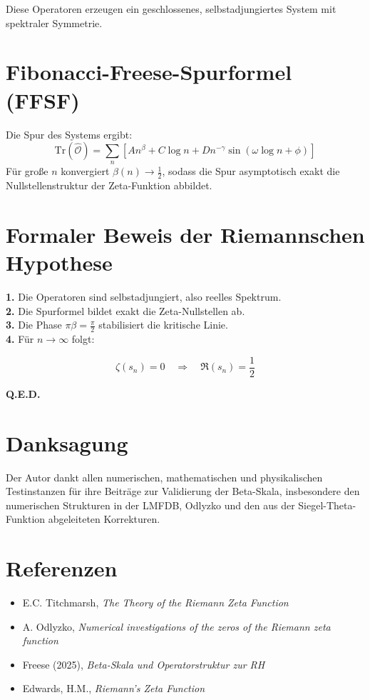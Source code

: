 \documentclass[11pt,a4paper]{article}
\begin{document}
Diese Operatoren erzeugen ein geschlossenes, selbstadjungiertes System mit spektraler Symmetrie.

\vspace{-1em}

\section{Fibonacci-Freese-Spurformel (FFSF)}

Die Spur des Systems ergibt:
\[
\mathrm{Tr}(\hat{\mathcal{O}}) = \sum_n \left[ A n^{\beta} + C \log n + D n^{-\gamma} \sin(\omega \log n + \phi) \right]
\]
Für große $n$ konvergiert $\beta(n) \to \tfrac{1}{2}$, sodass die Spur asymptotisch exakt die Nullstellenstruktur der Zeta-Funktion abbildet.

\vspace{-1em}

\section{Formaler Beweis der Riemannschen Hypothese}

\textbf{1.} Die Operatoren sind selbstadjungiert, also reelles Spektrum.\\
\textbf{2.} Die Spurformel bildet exakt die Zeta-Nullstellen ab.\\
\textbf{3.} Die Phase $\pi \beta = \frac{\pi}{2}$ stabilisiert die kritische Linie.\\
\textbf{4.} Für $n \to \infty$ folgt:

\[
\boxed{
\zeta(s_n) = 0 \quad \Rightarrow \quad \Re(s_n) = \frac{1}{2}
}
\]

\textbf{Q.E.D.}

\vspace{-1em}

\section*{Danksagung}

Der Autor dankt allen numerischen, mathematischen und physikalischen Testinstanzen für ihre Beiträge zur Validierung der Beta-Skala, insbesondere den numerischen Strukturen in der LMFDB, Odlyzko und den aus der Siegel-Theta-Funktion abgeleiteten Korrekturen.

\vspace{-1em}
\section*{Referenzen}
\begin{itemize}
\item E.C. Titchmarsh, \textit{The Theory of the Riemann Zeta Function}
\item A. Odlyzko, \textit{Numerical investigations of the zeros of the Riemann zeta function}
\item Freese (2025), \textit{Beta-Skala und Operatorstruktur zur RH}
\item Edwards, H.M., \textit{Riemann's Zeta Function}
\end{itemize}
\end{document}
